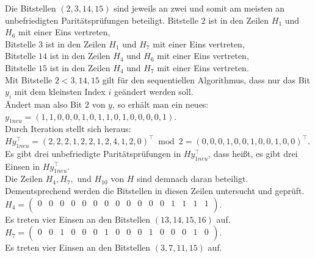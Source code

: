 \begin{Beispiel}
    Die Bitstellen $(2, 3, 14, 15)$ sind jeweils an zwei und somit am meisten an unbefriedigten Paritätsprüfungen beteiligt.
    Bitstelle $2$ ist in den Zeilen $H_1$ und $H_6$ mit einer Eins vertreten,\\
    Bitstelle $3$ ist in den Zeilen $H_1$ und $H_7$ mit einer Eins vertreten,\\
    Bitstelle $14$ ist in den Zeilen $H_4$ und $H_6$ mit einer Eins vertreten,\\
    Bitstelle $15$ ist in den Zeilen $H_4$ und $H_7$ mit einer Eins vertreten.\\
    Mit Bitstelle $2 < 3, 14, 15$ gilt für den sequentiellen Algorithmus, dass nur das Bit $y_i$ mit dem kleinsten Index $i$ geändert werden soll.\\
    
    Ändert man also Bit $2$ von $y$, so erhält man ein neues:\\
    $y_{1neu} = (1,1,0,0,0,1,0,1,1,0,1,0,0,0,0,1).$\\
    
    Durch Iteration stellt sich heraus:\\
    $Hy_{1neu}^\intercal = (2,2,2,1,2,2,1,2,4,1,2,0)^\intercal \bmod 2 = (0,0,0,1,0,0,1,0,0,1,0,0)^\intercal$.\\
    
    Es gibt drei unbefriedigte Paritätsprüfungen in $Hy_{1neu}^\intercal$, 
    dass hei\ss{}t, es gibt drei Einsen in $Hy_{1neu}^\intercal.$\\
    Die Zeilen $H_4, H_7,$ und $H_{10}$ von $H$ sind demnach daran beteiligt.\\
    Dementsprechend werden die Bitstellen in diesen Zeilen untersucht und geprüft.\\
    
    $H_4= \left( \begin{array}{rrrrrrrrrrrrrrrr}
        0 & 0 & 0 & 0 & 0 & 0 & 0 & 0 & 0 & 0 & 0 & 0 & 1 & 1 & 1 & 1 \\
       \end{array}\right). 
    $\\
    Es treten vier Einsen an den Bitstellen $(13, 14, 15, 16)$ auf.\\
    
    $H_7= \left( \begin{array}{rrrrrrrrrrrrrrrr}
        0 & 0 & 1 & 0 & 0 & 0 & 1 & 0 & 0 & 0 & 1 & 0 & 0 & 0 & 1 & 0 \\
       \end{array}\right). 
    $\\
    Es treten vier Einsen an den Bitstellen $(3, 7, 11, 15)$ auf.\\
    

\end{Beispiel}
